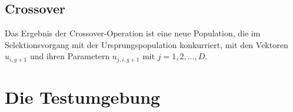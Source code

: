 		\subsection{Crossover}
		\label{sec:de-crossover}
		
			Das Ergebnis der Crossover-Operation ist eine neue Population, die im Selektionsvorgang mit der Ursprungspopulation konkurriert, mit den Vektoren $u_{i, g+1}$ und ihren Parametern $u_{j, i, g+1}$ mit $j = 1, 2, ... , D$. 
			
	\section{Die Testumgebung}
	\label{sec:testsetting}
